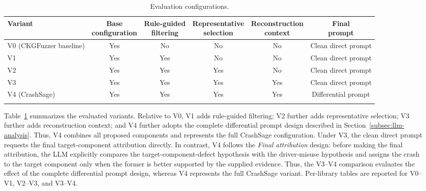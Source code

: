 \documentclass[pdflatex,sn-basic]{sn-jnl}%
\renewcommand{\arraystretch}{1.16}%
\theoremstyle{thmstyleone}%
\theoremstyle{thmstyletwo}%
\theoremstyle{thmstylethree}%
\begin{document}
\begin{table}[ht]
\caption{Evaluation configurations.}
\label{tab:evaluation-configurations}
\centering
\scriptsize
\fontsize{7.8}{8.8}\selectfont
\setlength{\tabcolsep}{1.2pt}
\renewcommand{\arraystretch}{1.12}
\begin{tabular*}{\linewidth}{@{\extracolsep{\fill}}lccccc}
\toprule
\textbf{Variant} & \makecell{\textbf{Base}\\\textbf{configuration}} & \makecell{\textbf{Rule-guided}\\\textbf{filtering}} & \makecell{\textbf{Representative}\\\textbf{selection}} & \makecell{\textbf{Reconstruction}\\\textbf{context}} & \makecell{\textbf{Final}\\\textbf{prompt}} \\
\midrule
V0 (CKGFuzzer baseline) & Yes & No & No & No & Clean direct prompt \\
V1 & Yes & Yes & No & No & Clean direct prompt \\
V2 & Yes & Yes & Yes & No & Clean direct prompt \\
V3 & Yes & Yes & Yes & Yes & Clean direct prompt \\
V4 (CrashSage) & Yes & Yes & Yes & Yes & Differential prompt \\
\botrule
\end{tabular*}
\end{table}

\FloatBarrier
Table~\ref{tab:evaluation-configurations} summarizes the evaluated variants. Relative to V0, V1 adds rule-guided filtering; V2 further adds representative selection; V3 further adds reconstruction context; and V4 further adopts the complete differential prompt design described in Section~\ref{subsec:llm-analysis}. Thus, V4 combines all proposed components and represents the full CrashSage configuration. Under V3, the clean direct prompt requests the final target-component attribution directly. In contrast, V4 follows the \emph{Final attribution} design: before making the final attribution, the LLM explicitly compares the target-component-defect hypothesis with the driver-misuse hypothesis and assigns the crash to the target component only when the former is better supported by the supplied evidence. Thus, the V3--V4 comparison evaluates the effect of the complete differential prompt design, whereas V4 represents the full CrashSage variant. Per-library tables are reported for V0--V1, V2--V3, and V3--V4.
\end{document}
